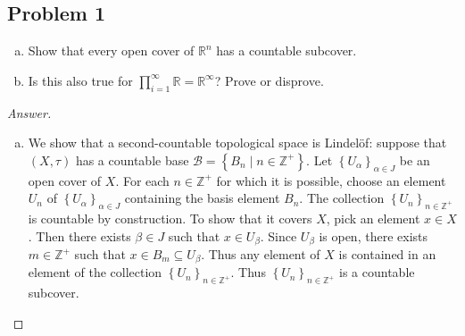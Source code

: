 \documentclass[12pt]{article}
\newcommand{\z}{\mathbb{Z}}
\newcommand{\real}{\mathbb{R}}
\newcommand\setb[1]{\left \{ #1 \right \}}
\theoremstyle{definition}
\begin{document}
\subsection{Problem 1 \texorpdfstring{\cite{Blair}}{}}
\begin{enumerate}[(a)]
    \item Show that every open cover of $\real^n$ has a countable subcover.
    \item Is this also true for $\prod\limits_{i = 1}^{\infty} \real = \real^{\infty}$? Prove or disprove.
\end{enumerate}
\begin{proof}[Answer]
    \noindent
    \begin{enumerate}[(a)]
        \item We show that a second-countable topological space is Lindel\"of: suppose that $(X,\tau)$ has a countable base $\mathcal{B} = \setb{ B_n \mid n \in \z^+ }$. Let $\setb{ U_{\alpha} }_{\alpha \in J}$ be an open cover of $X$. For each $n \in \z^+$ for which it is possible, choose an element $U_n$ of $\setb{ U_{\alpha} }_{\alpha \in J}$ containing the basis element $B_n$. The collection $\setb{ U_n }_{n \in \z^+}$ is countable by construction. To show that it covers $X$, pick an element $x \in X$. Then there exists $\beta \in J$ such that $x \in U_{\beta}$. Since $U_{\beta}$ is open, there exists $m \in \z^+$ such that $x \in B_m \subseteq U_{\beta}$. Thus any element of $X$ is contained in an element of the collection $\setb{ U_n }_{n \in \z^+}$. Thus $\setb{ U_n }_{n \in \z^+}$ is a countable subcover.
        

\end{enumerate}
\end{proof}
\end{document}
